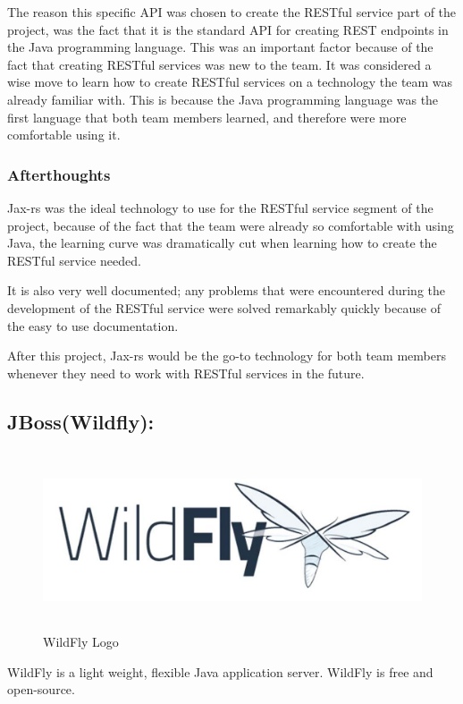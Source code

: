 The reason this specific API was chosen to create the RESTful service part of the project, was the fact that it is the standard API for creating REST endpoints in the Java programming language. This was an important factor because of the fact that creating RESTful services was new to the team. It was considered a wise move to learn how to create RESTful services on a technology the team was already familiar with. 
This is because the Java programming language was the first language that both team members learned, and therefore were more comfortable using it. 

\subsubsection{Afterthoughts}
Jax-rs was the ideal technology to use for the RESTful service segment of the project, because of the fact that the team were already so comfortable with using Java, the learning curve was dramatically cut when learning how to create the RESTful service needed. 

It is also very well documented; any problems that were encountered during the development of the RESTful service were solved remarkably quickly because of the easy to use documentation.

\bigskip

After this project, Jax-rs would be the go-to technology for both team members whenever they need to work with RESTful services in the future.

\subsection{JBoss(Wildfly):}
\label{sec:TechnologyReviewWildfly}

\begin{figure}[H]
    \centering
    \includegraphics[width=\textwidth, height=150pt]{img/WildFlyLogo.PNG}
    \caption{WildFly Logo}
    \label{fig:my_label}
\end{figure}
WildFly  is a light weight, flexible Java application server. WildFly is free and open-source.

